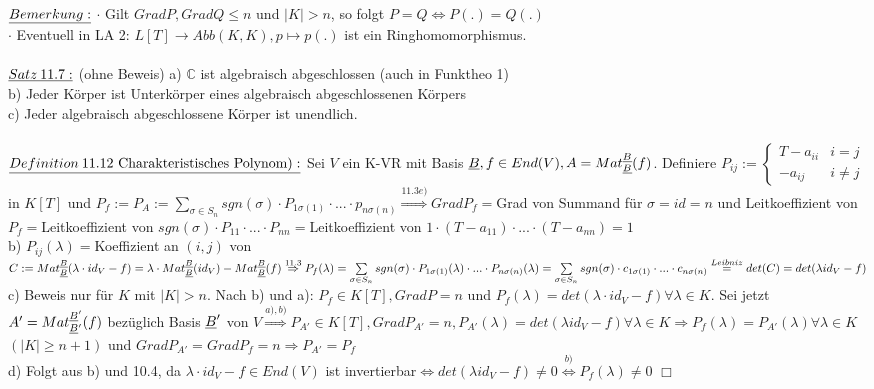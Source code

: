\documentclass[fleqn, a4paper, 11pt]{article}
\begin{document}
$\uline{Bemerkung:}$ $\cdot$ Gilt $Grad P,Grad Q\leq n$ und $|K|>n$, so folgt $P=Q\Leftrightarrow P(.)=Q(.)$\\
$\cdot$ Eventuell in LA 2: $L[T]\rightarrow Abb(K,K),p\mapsto p(.)$ ist ein Ringhomomorphismus.\\
\\
$\uline{Satz\:11.7:}$ (ohne Beweis) a) $\mathbb{C}$ ist algebraisch abgeschlossen (auch in Funktheo 1)\\
b) Jeder K\"orper ist Unterk\"orper eines algebraisch abgeschlossenen K\"orpers\\
c) Jeder algebraisch abgeschlossene K\"orper ist unendlich.\\
\\
$\uline{Definition\:11.12\text{ Charakteristisches Polynom)}:}$ Sei $V$ ein K-VR mit Basis $\uline{B},f\in End(V),A=Mat_{\uline{B}}^{\uline{B}}(f)$. Definiere $P_{ij}:=\begin{cases}
	T-a_{ii} & i=j\\
	-a_{ij} & i\neq j
\end{cases}$ in $K[T]$ und $P_f:=P_A:=\sum\limits_{\sigma\in S_n}sgn(\sigma)\cdot P_{1\sigma(1)}\cdot...\cdot p_{n\sigma(n)}\stackrel{11.3e)}{\Rightarrow} Grad P_f=$Grad von Summand f\"ur $\sigma=id=n$ und Leitkoeffizient von $P_f=$Leitkoeffizient von $sgn(\sigma)\cdot P_{11}\cdot ...\cdot P_{nn}=$Leitkoeffizient von $1\cdot(T-a_{11})\cdot ...\cdot (T-a_{nn})=1$\\
b) $P_{ij}(\lambda)=$Koeffizient an $(i,j)$ von $C:=Mat_{\uline{B}}^{\uline{B}}(\lambda\cdot id_V -f)=\lambda\cdot Mat_{\uline{B}}^{\uline{B}}(id_V)-Mat_{\uline{B}}^{\uline{B}}(f)\stackrel{11.3}{\Rightarrow}P_f(\lambda)=\sum\limits_{\sigma\in S_n} sgn(\sigma)\cdot P_{1\sigma(1)}(\lambda)\cdot ...\cdot P_{n\sigma(n)}(\lambda)=\sum\limits_{\sigma\in S_n}sgn(\sigma)\cdot c_{1\sigma(1)}\cdot...\cdot c_{n\sigma(n)}\stackrel{Leibniz}{=}det(C)=det(\lambda id_V-f)$\\
c) Beweis nur f\"ur $K$ mit $|K|>n$. Nach b) und a): $P_f\in K[T], Grad P=n$ und $P_f(\lambda)=det(\lambda\cdot id_V-f)\forall\lambda\in K$. Sei jetzt $A'=Mat_{\uline{B}'}^{\uline{B}'}(f)$ bez\"uglich Basis $\uline{B}'$ von $V\stackrel{a),b)}{\Rightarrow} P_{A'}\in K[T], Grad P_{A'}=n,P_{A'}(\lambda)=det(\lambda id_V-f) \forall\lambda\in K\Rightarrow P_f(\lambda)=P_{A'}(\lambda)\forall\lambda\in K$ $(|K|\geq n+1)$ und $Grad P_{A'}=Grad P_f=n\Rightarrow P_{A'}=P_f$\\
d) Folgt aus b) und 10.4, da $\lambda\cdot id_V -f\in End(V)$ ist invertierbar$\Leftrightarrow det(\lambda id_V -f)\neq 0\stackrel{b)}{\Leftrightarrow}P_f(\lambda)\neq 0$ \hfill $\Box$\\
\end{document}

